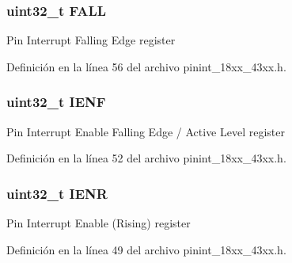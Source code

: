 \subsubsection[{\texorpdfstring{F\+A\+LL}{FALL}}]{ uint32\+\_\+t F\+A\+LL}\hypertarget{struct_l_p_c___p_i_n___i_n_t___t_abd34712d9e113e4f925089fbc45998e3}{}\label{struct_l_p_c___p_i_n___i_n_t___t_abd34712d9e113e4f925089fbc45998e3}
Pin Interrupt Falling Edge register 

Definición en la línea 56 del archivo pinint\+\_\+18xx\+\_\+43xx.\+h.

\subsubsection[{\texorpdfstring{I\+E\+NF}{IENF}}]{ uint32\+\_\+t I\+E\+NF}\hypertarget{struct_l_p_c___p_i_n___i_n_t___t_afc5d747cb3b672a0fde5c2cc100444b3}{}\label{struct_l_p_c___p_i_n___i_n_t___t_afc5d747cb3b672a0fde5c2cc100444b3}
Pin Interrupt Enable Falling Edge / Active Level register 

Definición en la línea 52 del archivo pinint\+\_\+18xx\+\_\+43xx.\+h.

\subsubsection[{\texorpdfstring{I\+E\+NR}{IENR}}]{ uint32\+\_\+t I\+E\+NR}\hypertarget{struct_l_p_c___p_i_n___i_n_t___t_a3d38f040352ef92834598eaa3bc1d984}{}\label{struct_l_p_c___p_i_n___i_n_t___t_a3d38f040352ef92834598eaa3bc1d984}
Pin Interrupt Enable (Rising) register 

Definición en la línea 49 del archivo pinint\+\_\+18xx\+\_\+43xx.\+h.

